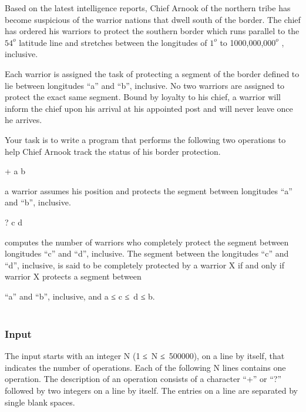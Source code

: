 



     Based on the latest intelligence reports, Chief Arnook of the northern tribe has become suspicious of the warrior nations that dwell south of the border. The chief has ordered his warriors to protect the southern border which runs parallel to the $54^{o}$     latitude line and stretches between the longitudes of $1^{o}$     to 1000,000,$000^{o}$     , inclusive.    

     Each warrior is assigned the task of protecting a segment of the border defined to lie between longitudes “a” and “b”, inclusive. No two warriors are assigned to protect the exact same segment. Bound by loyalty to his chief, a warrior will inform the chief upon his arrival at his appointed post and will never leave once he arrives.    

         Your task is to write a program that performs the following two operations                   to help Chief Arnook track the status of his border protection.         



        + a b       

        a warrior assumes his position and protects the segment between longitudes “a” and “b”, inclusive.       



        ? c d       

           computes the number of warriors who completely protect the segment between longitudes “c” and “d”, inclusive. The segment between the longitudes “c” and “d”, inclusive, is said to be completely protected by a warrior X if and only if warrior X protects a segment between          

            “a” and “b”, inclusive, and a ≤ c ≤ d ≤ b.            
\\


\\

\subsubsection{\textbf{        Input       }}

    The input starts with an integer N (1 ≤ N ≤ 500000), on a line by itself, that indicates the number of operations. Each of the following N lines contains one operation. The description of an operation consists of a character “+” or “?” followed by two integers on a line by itself. The entries on a line are separated by single blank spaces.   


